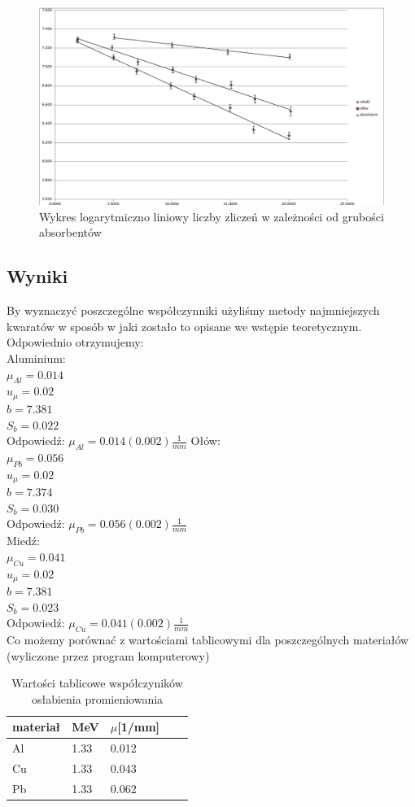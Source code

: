 \documentclass[a4paper]{article}
\begin{document}
\begin{figure}[h!]
\centering
\includegraphics[scale=0.55]{ln_x_wykres.png}
\caption{Wykres logarytmiczno liniowy liczby zliczeń w zależności od grubości absorbentów}
\label{uklad_pomiarowy}
\end{figure}

\newpage
\subsection{Wyniki}
By wyznaczyć poszczególne współczynniki użyliśmy metody najmniejszych kwaratów w sposób w jaki zostało to opisane we wstępie teoretycznym. Odpowiednio otrzymujemy: \\
Aluminium:\\
$\mu_{Al} = 0.014$\\
$u_{\mu} = 0.02$\\
$b = 7.381$\\
$S_{b} = 0.022$\\
Odpowiedź: $\mu_{Al} = 0.014(0.002) \frac{1}{mm}$
Ołów:\\
$\mu_{Pb} = 0.056$\\
$u_{\mu} = 0.02$\\
$b = 7.374$\\
$S_{b} = 0.030$\\

Odpowiedź: $\mu_{Pb} = 0.056(0.002) \frac{1}{mm}$\\
Miedź:\\
$\mu_{Cu} = 0.041$\\
$u_{\mu} = 0.02$\\
$b = 7.381$\\
$S_{b} = 0.023$\\
Odpowiedź: $\mu_{Cu} = 0.041(0.002) \frac{1}{mm}$ \\
Co możemy porównać z wartościami tablicowymi dla poszczególnych materiałów (wyliczone przez program komputerowy)
\begin{table}[h!]
\centering
\begin{tabular}{ | l | l | l | l | l | }
\hline
materiał & MeV & $\mu$[1/mm] \\ \hline
Al & 1.33 & 0.012 \\ \hline  
Cu & 1.33 & 0.043 \\ \hline  
Pb & 1.33 & 0.062 \\ \hline  
\end{tabular}
\caption{Wartości tablicowe współczyników osłabienia promieniowania}
\label{pomiary_sruba}
\end{table}
\end{document}

